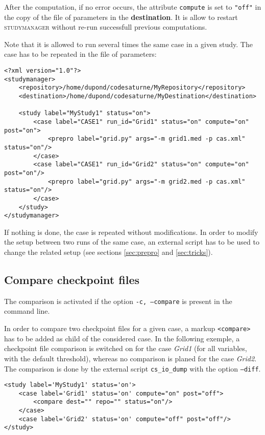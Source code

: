 \documentclass[a4paper,10pt,twoside]{csshortdoc}
\begin{document}
After the computation, if no error occurs, the attribute \texttt{compute} is set
to \texttt{"off"} in the copy of the file of parameters in the
\textbf{destination}. It is allow to restart \textsc{studymanager} without re-run
successfull previous computations.

Note that it is allowed to run several times the same case in a given study.
The case has to be repeated in the file of parameters:

\small
\begin{verbatim}
<?xml version="1.0"?>
<studymanager>
    <repository>/home/dupond/codesaturne/MyRepository</repository>
    <destination>/home/dupond/codesaturne/MyDestination</destination>

    <study label="MyStudy1" status="on">
        <case label="CASE1" run_id="Grid1" status="on" compute="on" post="on">
            <prepro label="grid.py" args="-m grid1.med -p cas.xml" status="on"/>
        </case>
        <case label="CASE1" run_id="Grid2" status="on" compute="on" post="on"/>
            <prepro label="grid.py" args="-m grid2.med -p cas.xml" status="on"/>
        </case>
    </study>
</studymanager>
\end{verbatim}
\normalsize

If nothing is done, the case is repeated without modifications. In order to modify
the setup between two runs of the same case, an external script has to be used to
change the related setup (see sections \ref{sec:prepro} and \ref{sec:tricks}).

\subsection{Compare checkpoint files}

The comparison is activated if the option \texttt{-c, --compare} is present in
the command line.

In order to compare two checkpoint files for a given case, a markup
\texttt{<compare>} has to be added as child of the considered case.
In the following exemple, a checkpoint file comparison is switched on for the
case \textit{Grid1} (for all
variables, with the default threshold), whereas no comparison is planed for
the case \textit{Grid2}. The comparison is done by the external
script \texttt{cs\_io\_dump} with the option \texttt{--diff}.

\small
\begin{verbatim}
<study label='MyStudy1' status='on'>
    <case label='Grid1' status='on' compute="on" post="off">
        <compare dest="" repo="" status="on"/>
    </case>
    <case label='Grid2' status='on' compute="off" post="off"/>
</study>
\end{verbatim}
\normalsize
\end{document}
